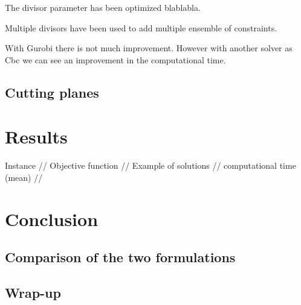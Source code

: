 \documentclass[a4paper,10pt]{article}
\begin{document}
The divisor parameter has been optimized blablabla.

Multiple divisors have been used to add multiple ensemble of constraints.

With Gurobi there is not much improvement. However with another solver as Cbc we can see an improvement in the computational time. 

\subsection{Cutting planes}


\section{Results}

 Instance // Objective function // Example of solutions  // computational time (mean) //



\section{Conclusion}
	\subsection{Comparison of the two formulations}
	\subsection{Wrap-up}
	
\end{document}
